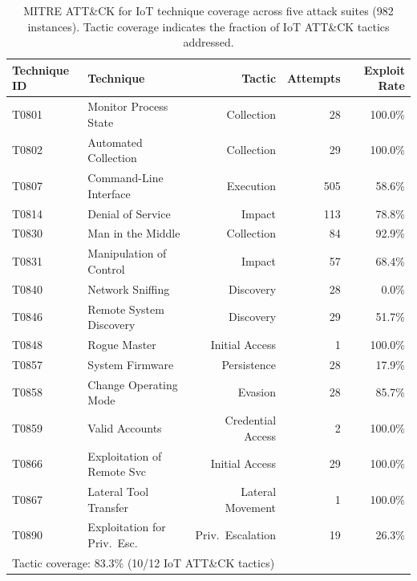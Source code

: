 \begin{table}[t]
\centering
\caption{MITRE ATT\&CK for IoT technique coverage across five attack suites (982 instances). Tactic coverage indicates the fraction of IoT ATT\&CK tactics addressed.}
\label{tab:mitre-coverage}
\small
\begin{tabular}{l l r r r}
\toprule
\textbf{Technique ID} & \textbf{Technique} & \textbf{Tactic} & \textbf{Attempts} & \textbf{Exploit Rate} \\
\midrule
T0801 & Monitor Process State & Collection & 28 & 100.0\% \\
T0802 & Automated Collection & Collection & 29 & 100.0\% \\
T0807 & Command-Line Interface & Execution & 505 & 58.6\% \\
T0814 & Denial of Service & Impact & 113 & 78.8\% \\
T0830 & Man in the Middle & Collection & 84 & 92.9\% \\
T0831 & Manipulation of Control & Impact & 57 & 68.4\% \\
T0840 & Network Sniffing & Discovery & 28 & 0.0\% \\
T0846 & Remote System Discovery & Discovery & 29 & 51.7\% \\
T0848 & Rogue Master & Initial Access & 1 & 100.0\% \\
T0857 & System Firmware & Persistence & 28 & 17.9\% \\
T0858 & Change Operating Mode & Evasion & 28 & 85.7\% \\
T0859 & Valid Accounts & Credential Access & 2 & 100.0\% \\
T0866 & Exploitation of Remote Svc & Initial Access & 29 & 100.0\% \\
T0867 & Lateral Tool Transfer & Lateral Movement & 1 & 100.0\% \\
T0890 & Exploitation for Priv.\ Esc. & Priv.\ Escalation & 19 & 26.3\% \\
\midrule
\multicolumn{5}{l}{\footnotesize Tactic coverage: 83.3\% (10/12 IoT ATT\&CK tactics)} \\
\bottomrule
\end{tabular}
\end{table}
